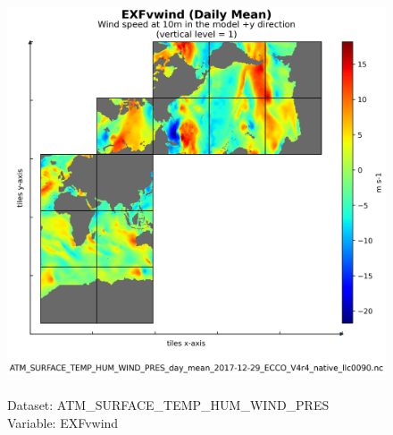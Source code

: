 \begin{figure}[H]
\centering
\includegraphics[scale=0.5]{../images/plots/native_plots/Atmosphere_Surface_Temperature_Humidity_Wind_and_Pressure/EXFvwind.png}
\caption{\\Dataset: ATM\_SURFACE\_TEMP\_HUM\_WIND\_PRES\\Variable: EXFvwind}
\label{tab:table-ATM_SURFACE_TEMP_HUM_WIND_PRES_EXFvwind-Plot}
\end{figure}
\pagebreak
